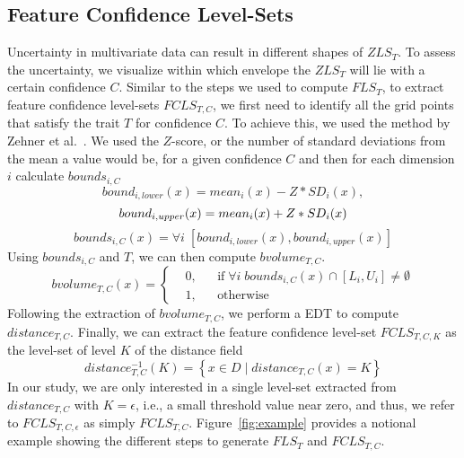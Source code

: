 \subsection{Feature Confidence Level-Sets}
Uncertainty in multivariate data can result in different shapes of $ZLS_{T}$.
%
To assess the uncertainty, we visualize within which envelope the $ZLS_{T}$ will lie with a certain confidence $C$.
%
Similar to the steps we used to compute $FLS_{T}$, to extract feature confidence level-sets $FCLS_{T,C}$, we first need to identify all the grid points that satisfy the trait $T$ for confidence $C$.
%
To achieve this, we used the method by Zehner et al.~\cite{zehner2010visualization}. 
%
We used the $Z$-score, or the number of standard deviations from the mean a value would be, for a given confidence $C$ and then for each dimension $i$ calculate $bounds_{i,C}$
\begin{equation}
bound_{i,lower}(x) = mean_{i}(x) - Z*SD_{i}(x),
\end{equation}
\begin{equation}
bound_{i,upper}(x) = mean_{i}(x) + Z*SD_{i}(x)\\
\end{equation}
\begin{equation}
bounds_{i,C}(x) = \forall i \; [bound_{i, lower}(x), bound_{i,upper}(x)]
\end{equation}
%
Using $bounds_{i,C}$ and $T$, we can then compute $bvolume_{T,C}$.
\begin{equation}
  bvolume_{T,C}(x) = \left \{
  \begin{aligned}
    &0, && \text{if}\; \forall i\; bounds_{i, C}(x) \cap [L_{i}, U_{i}] \neq \emptyset \\
    &1, && \text{otherwise}
  \end{aligned} \right.
\end{equation}
%
Following the extraction of $bvolume_{T,C}$, we perform a EDT to compute $distance_{T,C}$.
%
Finally, we can extract the feature confidence level-set $FCLS_{T,C,K}$ as the level-set of level $K$ of the distance field
%
\begin{equation} 
distance_{T,C}^{-1}(K) = \left\{ x \in D\; |\; distance_{T,C}(x) = K\right\}
\end{equation}
%
In our study, we are only interested in a single level-set extracted from $distance_{T,C}$ with $K = \epsilon$, i.e., a small threshold value near zero, and thus, we refer to $FCLS_{T,C,\epsilon}$ as simply $FCLS_{T,C}$.
%
Figure~\ref{fig:example} provides a notional example showing the different steps to generate $FLS_{T}$ and $FCLS_{T,C}$.
